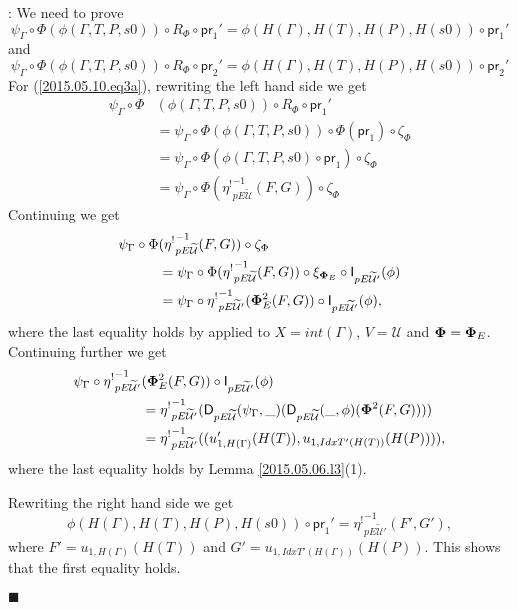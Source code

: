 \documentclass[12pt]{article}
\numberwithin{equation}{section}
\newenvironment{eq}{\begin{equation}}{\end{equation}}
\newenvironment{myproof}{{\bf Proof}:}{$\blacksquare$ \vskip 5mm }
\newcommand{\wt}{\widetilde}
\newcommand{\U}{\mathcal{U}}
\newcommand{\D}{\mathsf{D}}
\newcommand{\I}{\mathsf{I}}
\newcommand{\etashriek}{\eta^!}
\newcommand{\etaunshriek}{{\etashriek}^{-1}}
\newcommand{\pr}{\mathsf{pr}}
\begin{document}
\begin{myproof}
We need to prove
%
\begin{eq}
\label{2015.05.10.eq3a} \psi_{\Gamma}\circ \Phi(\phi(\Gamma,T,P,s0))\circ
R_{\Phi}\circ \pr_1' = \phi(H(\Gamma),H(T),H(P),H(s0))\circ \pr_1'
\end{eq}%
%
and
%
%
\begin{eq}
\label{2015.05.10.eq3b} \psi_{\Gamma}\circ \Phi(\phi(\Gamma,T,P,s0))\circ
R_{\Phi}\circ \pr_2' = \phi(H(\Gamma),H(T),H(P),H(s0))\circ \pr_2'
\end{eq}%
%
For (\ref{2015.05.10.eq3a}), rewriting the left hand side we get
%
\begin{align*}
  \psi_{\Gamma}\circ \Phi&(\phi(\Gamma,T,P,s0))\circ R_{\Phi}\circ \pr_1'  \\
    & = \psi_{\Gamma}\circ \Phi(\phi(\Gamma,T,P,s0))\circ\Phi(\pr_1)\circ \zeta_{\Phi} \\
    & = \psi_{\Gamma}\circ \Phi(\phi(\Gamma,T,P,s0)\circ \pr_1)\circ \zeta_{\Phi} \\
    & = \psi_{\Gamma}\circ \Phi(\etaunshriek_{pE\wt{\U}}(F,G))\circ \zeta_{\Phi}
\end{align*}
%
Continuing we get
%
\begin{align*}
  \psi_{\Gamma}\circ \Phi&(\etaunshriek_{pE\wt{\U}}(F,G))\circ \zeta_{\Phi} \\
    & = \psi_{\Gamma}\circ \Phi(\etaunshriek_{pE\wt{\U}}(F,G))\circ \xi_{{\bf \Phi}_E}\circ \I_{pE\wt{\U}'}(\phi) \\
    & = \psi_{\Gamma}\circ\etaunshriek_{pE\wt{\U}'}({\bf\Phi}^2_E(F,G))\circ \I_{pE\wt{\U}'}(\phi),
\end{align*}
%
where the last equality holds by \cite[Lemma 5.8]{fromunivwithPi} applied to
$X=int(\Gamma)$, $V=\U$ and ${\bf\Phi}={\bf\Phi}_E$. Continuing further we get
%
\begin{align*}
  \psi_{\Gamma}\circ \etaunshriek_{pE\wt{\U}'}&({\bf\Phi}^2_E(F,G))\circ \I_{pE\wt{\U}'}(\phi) \\
    & = \etaunshriek_{pE\wt{\U}'}(\D_{pE\wt{\U}}(\psi_{\Gamma},\_)(\D_{pE\wt{\U}}(\_,\phi)({\bf\Phi}^2(F,G)))) \\
    & = \etaunshriek_{pE\wt{\U}'}((u_{1,H(\Gamma)}'(H(T)),u_{1,IdxT'(H(T))}(H(P)))),
\end{align*}
%
where the last equality holds by Lemma \ref{2015.05.06.l3}(1).

Rewriting the right hand side we get
%
$$\phi(H(\Gamma),H(T),H(P),H(s0))\circ \pr_1'=\etaunshriek_{pE\wt{\U}'}(F',G'),$$
%
where $F'=u_{1,H(\Gamma)}(H(T))$ and $G'=u_{1,IdxT'(H(\Gamma))}(H(P))$.  This
shows that the first equality holds.


\end{myproof}
\end{document}
